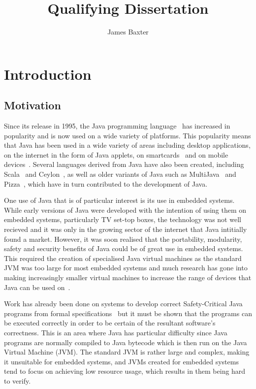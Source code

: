 \documentclass[a4paper,12pt]{article}
\title{Qualifying Dissertation}
\author{James Baxter}
\date{}
\begin{document}
\maketitle

\section{Introduction}

\subsection{Motivation}

Since its release in 1995, the Java programming language~\cite{gosling2013} has increased in popularity and is now used on a wide variety of platforms.
This popularity means that Java has been used in a wide variety of areas including desktop applications, on the internet in the form of Java applets, on smartcards~\cite{chen2000} and on mobile devices~\cite{oracle2014}.
Several languages derived from Java have also been created, including Scala~\cite{lausanne2015} and Ceylon~\cite{redhat2015}, as well as older variants of Java such as MultiJava~\cite{clifton2006} and Pizza~\cite{odersky1997}, which have in turn contributed to the development of Java.

One use of Java that is of particular interest is its use in embedded systems.
While early versions of Java were developed with the intention of using them on embedded systems, particularly TV set-top boxes, the technology was not well recieved and it was only in the growing sector of the internet that Java intitially found a market.
However, it was soon realised that the portability, modularity, safety and security benefits of Java could be of great use in embedded systems.
This required the creation of specialised Java virtual machines as the standard JVM was too large for most embedded systems and much research has gone into making increasingly smaller virtual machines to increase the range of devices that Java can be used on~\cite{caska2011,thomm2010}.


Work has already been done on systems to develop correct Safety-Critical Java programs from formal specifications~\cite{cavalcanti2011, cavalcanti2013} but it must be shown that the programs can be executed correctly in order to be certain of the resultant software's correctness.
This is an area where Java has particular difficulty since Java programs are normally compiled to Java bytecode which is then run on the Java Virtual Machine (JVM).
The standard JVM is rather large and complex, making it unsuitable for embedded systems, and JVMs created for embedded systems~\cite{thomm2010,caska2011} tend to focus on achieving low resource usage, which results in them being hard to verify.
\end{document}
